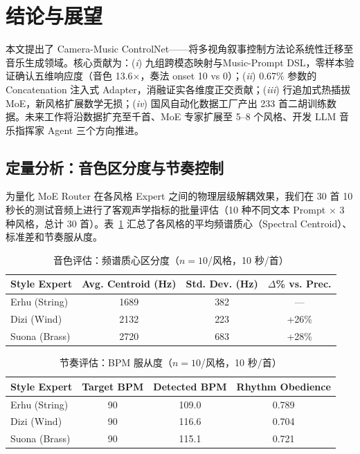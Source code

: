 \documentclass[11pt,twocolumn]{article}
\begin{document}
\section{结论与展望}

本文提出了 Camera-Music ControlNet——将多视角叙事控制方法论系统性迁移至音乐生成领域。核心贡献为：(\textit{i}) 九组跨模态映射与Music-Prompt DSL，零样本验证确认五维响应度（音色 13.6$\times$，奏法 onset 10 vs 0）；(\textit{ii}) 0.67\% 参数的 Concatenation 注入式 Adapter，消融证实各维度正交贡献；(\textit{iii}) 行追加式热插拔 MoE，新风格扩展数学无损；(\textit{iv}) 国风自动化数据工厂产出 233 首二胡训练数据。未来工作将沿数据扩充至千首、MoE 专家扩展至 5--8 个风格、开发 LLM 音乐指挥家 Agent 三个方向推进。


\subsection{定量分析：音色区分度与节奏控制}

为量化 MoE Router 在各风格 Expert 之间的物理层级解耦效果，我们在 30 首 10 秒长的测试音频上进行了客观声学指标的批量评估（10 种不同文本 Prompt $\times$ 3 种风格，总计 30 首）。表~\ref{tab:timbre_eval} 汇总了各风格的平均频谱质心（Spectral Centroid）、标准差和节奏服从度。

\begin{table}[t]
\centering\footnotesize
\caption{音色评估：频谱质心区分度（$n=10$/风格，10 秒/首）}
\label{tab:timbre_eval}
\begin{tabular}{@{}lccc@{}}
\toprule
\textbf{Style Expert} & \textbf{Avg. Centroid (Hz)} & \textbf{Std. Dev. (Hz)} & \textbf{$\Delta$\% vs. Prec.} \\
\midrule
Erhu (String)  & 1689 & 382 & ---   \\
Dizi (Wind)    & 2132 & 223 & +26\%  \\
Suona (Brass)  & 2720 & 683 & +28\%  \\
\bottomrule
\end{tabular}
\end{table}

\begin{table}[htbp]
\centering\footnotesize
\caption{节奏评估：BPM 服从度（$n=10$/风格，10 秒/首）}
\label{tab:rhythm_eval}
\begin{tabular}{@{}lccc@{}}
\toprule
\textbf{Style Expert} & \textbf{Target BPM} & \textbf{Detected BPM} & \textbf{Rhythm Obedience} \\
\midrule
Erhu (String)  & 90 & 109.0 & 0.789 \\
Dizi (Wind)    & 90 & 116.6 & 0.704 \\
Suona (Brass)  & 90 & 115.1 & 0.721 \\
\bottomrule
\end{tabular}
\end{table}
\end{document}
